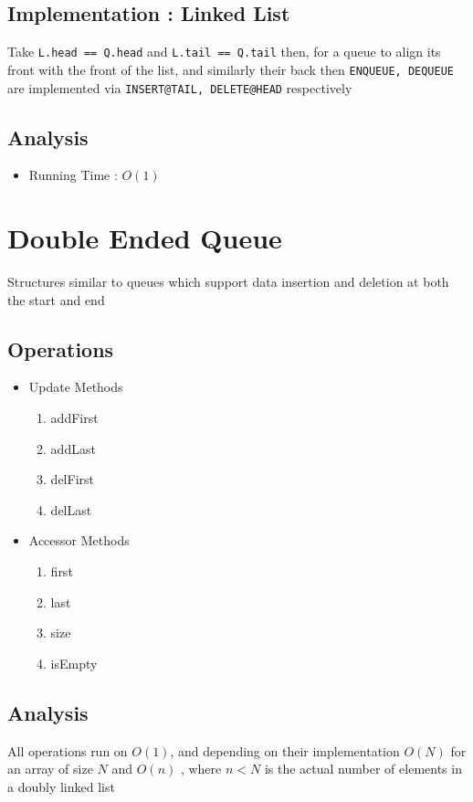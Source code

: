 
		\subsection{Implementation : Linked List}

		\par{Take \texttt{L.head == Q.head} and \texttt{L.tail == Q.tail} then, for a queue to align its front with the front of the list, and similarly their back then \texttt{ENQUEUE, DEQUEUE} are implemented via \texttt{INSERT@TAIL, DELETE@HEAD} respectively}

		\subsection{Analysis}
				\begin{itemize}
						\item[] Running Time : $O(1)$
				\end{itemize}


\section{Double Ended Queue}

		\par{Structures similar to queues which support data insertion and deletion at both the start and end}


		\subsection{Operations}
			\begin{itemize}
						\item[] Update Methods
				\begin{enumerate}
						\item addFirst
						\item addLast
						\item delFirst
						\item delLast
				\end{enumerate}
						\item[] Accessor Methods
				\begin{enumerate}
						\item first
						\item last
						\item size
						\item isEmpty
				\end{enumerate}
			\end{itemize}
		
		\subsection{Analysis}
				\par{All operations run on $O(1)$, and depending on their implementation $O(N)$ for an array of size $N$ and $O(n)$ , where $n < N$ is the actual number of elements in a doubly linked list}


